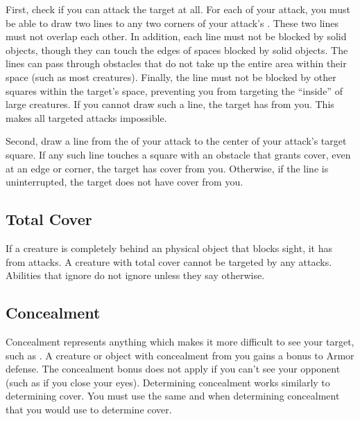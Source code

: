             First, check if you can attack the target at all.
            For each  of your attack, you must be able to draw two lines to any two corners of your attack's .
            These two lines must not overlap each other.
            In addition, each line must not be blocked by solid objects, though they can touch the edges of spaces blocked by solid objects.
            The lines can pass through obstacles that do not take up the entire area within their space (such as most creatures).
            Finally, the line must not be blocked by other squares within the target's space, preventing you from targeting the ``inside'' of large creatures.
            If you cannot draw such a line, the target has  from you.
            This makes all targeted attacks impossible.

            Second, draw a line from the  of your attack to the center of your attack's target square.
            If any such line touches a square with an obstacle that grants cover, even at an edge or corner, the target has cover from you.
            Otherwise, if the line is uninterrupted, the target does not have cover from you.

    \subsection{Total Cover}\label{Total Cover}
        If a creature is completely behind an physical object that blocks sight, it has  from attacks.
        A creature with total cover cannot be targeted by any attacks.
        Abilities that ignore  do not ignore  unless they say otherwise.

    \subsection{Concealment}\label{Concealment}
        Concealment represents anything which makes it more difficult to see your target, such as .
        A creature or object with concealment from you gains a  bonus to Armor defense.
        The concealment bonus does not apply if you can't see your opponent (such as if you close your eyes).
        Determining concealment works similarly to determining cover.
        You must use the same  and  when determining concealment that you would use to determine cover.

